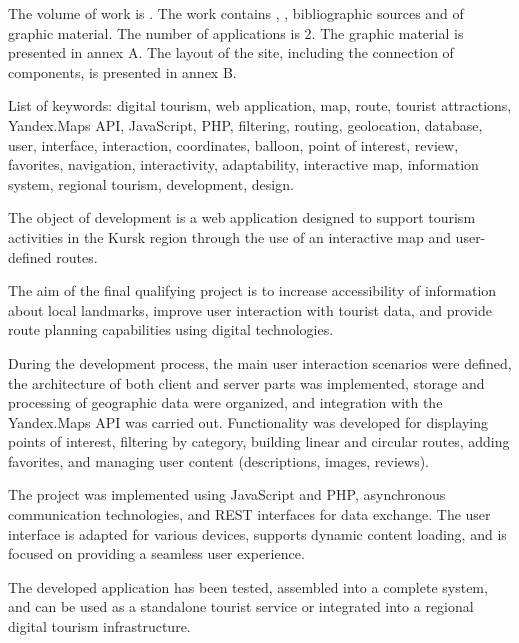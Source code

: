   
The volume of work is . The work contains , ,  bibliographic sources and  of graphic material. The number of applications is 2. The graphic material is presented in annex A. The layout of the site, including the connection of components, is presented in annex B.

List of keywords: digital tourism, web application, map, route, tourist attractions, Yandex.Maps API, JavaScript, PHP, filtering, routing, geolocation, database, user, interface, interaction, coordinates, balloon, point of interest, review, favorites, navigation, interactivity, adaptability, interactive map, information system, regional tourism, development, design.

The object of development is a web application designed to support tourism activities in the Kursk region through the use of an interactive map and user-defined routes.

The aim of the final qualifying project is to increase accessibility of information about local landmarks, improve user interaction with tourist data, and provide route planning capabilities using digital technologies.

During the development process, the main user interaction scenarios were defined, the architecture of both client and server parts was implemented, storage and processing of geographic data were organized, and integration with the Yandex.Maps API was carried out. Functionality was developed for displaying points of interest, filtering by category, building linear and circular routes, adding favorites, and managing user content (descriptions, images, reviews).

The project was implemented using JavaScript and PHP, asynchronous communication technologies, and REST interfaces for data exchange. The user interface is adapted for various devices, supports dynamic content loading, and is focused on providing a seamless user experience.

The developed application has been tested, assembled into a complete system, and can be used as a standalone tourist service or integrated into a regional digital tourism infrastructure.
